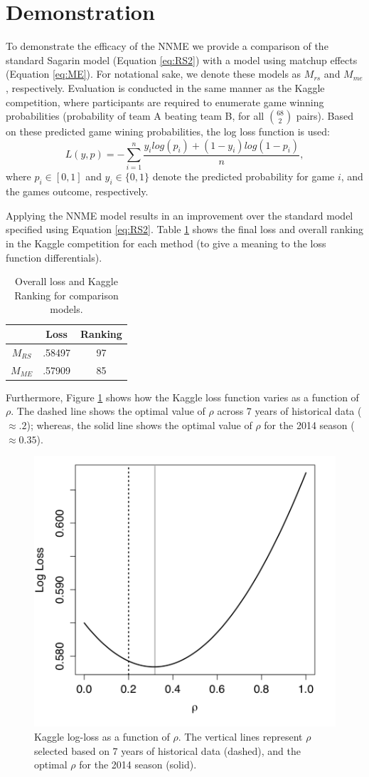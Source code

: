 \documentclass[letterpaper,12pt]{article}
\begin{document}
\section{Demonstration}
To demonstrate the efficacy of the NNME we provide a comparison of the standard Sagarin model (Equation \ref{eq:RS2}) with a model using matchup effects (Equation \ref{eq:ME}). For notational sake, we denote these models as $M_{rs}$ and $M_{me}$, respectively. Evaluation is conducted in the same manner as the Kaggle competition, where participants are required to enumerate game winning probabilities (probability of team A beating team B, for all $68 \choose 2$ pairs). Based on these predicted game wining probabilities, the log loss function is used:
\begin{equation}\label{eq:kaggle_score}
L(y,p)=-\sum_{i=1}^n\frac{y_ilog(p_i)+ (1-y_i)log(1-p_i)}{n},
\end{equation}
where $p_i\in[0,1]$ and $y_i\in\{0,1\}$ denote the predicted probability for game $i$, and the games outcome, respectively.

Applying the NNME model results in an improvement over the standard model specified using Equation \ref{eq:RS2}. Table \ref{tab:results} shows the final loss and overall ranking in the Kaggle competition for each method (to give a meaning to the loss function differentials).
\begin{table}[h!]
\caption{Overall loss and Kaggle Ranking for comparison models.\label{tab:results}}
\centering
\begin{tabular}{|c|cc|}
  \hline
    & Loss & Ranking\\ 
  \hline
  $M_{RS}$ & .58497 & 97 \\
  $M_{ME}$ & .57909 & 85 \\
   \hline
   \hline
\end{tabular}
\end{table}
Furthermore, Figure \ref{fig:result} shows how the Kaggle loss function varies as a function of $\rho$. The dashed line shows the optimal value of $\rho$ across 7 years of historical data ($\approx .2$); whereas, the solid line shows the optimal value of $\rho$ for the 2014 season ($\approx 0.35$). 
\begin{figure}[h!]
\centering
\includegraphics[width=.5\textwidth]{results_2014.pdf}
\caption{Kaggle log-loss as a function of $\rho$. The vertical lines represent $\rho$ selected based on 7 years of historical data (dashed), and the optimal $\rho$ for the 2014 season (solid).}
\label{fig:result}
\end{figure} 
\end{document}
